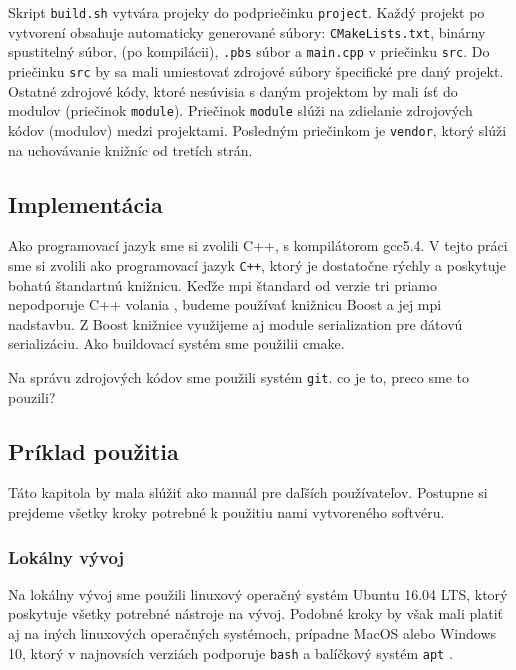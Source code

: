 Skript \texttt{build.sh} vytvára projeky do podpriečinku \texttt{project}. Každý projekt po vytvorení obsahuje automaticky generované súbory:
\texttt{CMakeLists.txt}, binárny spustitelný súbor, (po kompilácii), \texttt{.pbs} súbor a \texttt{main.cpp} v priečinku \texttt{src}.
Do priečinku \texttt{src} by sa mali umiestovať zdrojové súbory špecifické pre daný projekt.
Ostatné zdrojové kódy, ktoré nesúvisia s daným projektom by mali ísť do modulov (priečinok \texttt{module}).
Priečinok \texttt{module} slúži na zdielanie zdrojových kódov (modulov) medzi projektami.
Posledným priečinkom je \texttt{vendor}, ktorý slúži na uchovávanie knižníc od tretích strán.
\subsection{Implementácia}
Ako programovací jazyk sme si zvolili C++, s kompilátorom gcc5.4. 
V tejto práci sme si zvolili ako programovací jazyk \texttt{C++}, ktorý je dostatočne rýchly a poskytuje bohatú štandartnú knižnicu.
Keďže \acrshort{mpi} štandard od verzie tri priamo nepodporuje C++ volania \cite{mpi3-1}, budeme používať knižnicu Boost a jej \acrshort{mpi} nadstavbu.
Z Boost knižnice využijeme aj module serialization pre dátovú serializáciu.
Ako buildovací systém sme použilii cmake.

Na správu zdrojových kódov sme použili systém \texttt{git}. co je to, preco sme to pouzili?

\subsection{Príklad použitia}
Táto kapitola by mala slúžiť ako manuál pre daľších používateľov.
Postupne si prejdeme všetky kroky potrebné k použitiu nami vytvoreného softvéru.

\subsubsection{Lokálny vývoj}
\label{subsec:local-dev}
Na lokálny vývoj sme použili linuxový operačný systém Ubuntu 16.04 LTS, ktorý poskytuje všetky potrebné nástroje na vývoj.
Podobné kroky by však mali platiť aj na iných linuxových operačných systémoch, prípadne MacOS alebo Windows 10,
ktorý v najnovsích verziách podporuje \texttt{bash} a balíčkový systém \texttt{apt} \cite{bash-on-win}.

